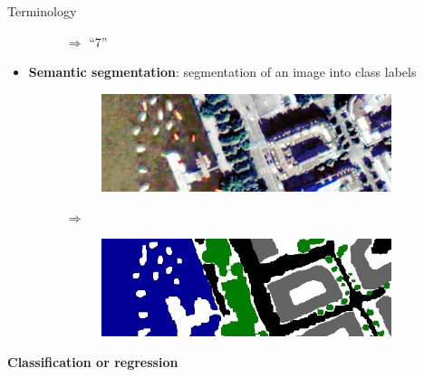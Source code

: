 \documentclass[xcolor={usenames,dvipsnames}]{beamer}
\begin{document}
\begin{frame}{Terminology}
\begin{itemize}
\begin{figure}[H]
\begin{subfigure}{.1\textwidth}
			\end{subfigure} $\Rightarrow$ ``7''
		\end{figure}\pause
		\item {\color{greenWUR}\textbf{Semantic segmentation}}: segmentation of an image into class labels
		\begin{figure}[H]
			\begin{subfigure}{0.38\textwidth}
				\centering
				\includegraphics[width=\textwidth]{Im_11_detail.jpg}
			\end{subfigure} $\Rightarrow$
			\begin{subfigure}{0.38\textwidth}
				\centering
				\includegraphics[width=\textwidth]{GT_11_detail.jpg}
			\end{subfigure}
		\end{figure}
	\end{itemize}
	\pause
	\centering
	\textbf{\color{greenWUR} Classification or regression}
\end{frame}
\end{document}

